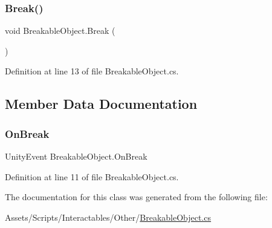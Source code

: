 \subsubsection{\texorpdfstring{Break()}{Break()}}
{\footnotesize\ttfamily void Breakable\+Object.\+Break (\begin{DoxyParamCaption}{ }\end{DoxyParamCaption})}



Definition at line 13 of file Breakable\+Object.\+cs.



\subsection{Member Data Documentation}
\mbox{\label{class_breakable_object_ab52a2c2d2d6438f97053da6c69d019e0}} 
\subsubsection{\texorpdfstring{On\+Break}{OnBreak}}
{\footnotesize\ttfamily Unity\+Event Breakable\+Object.\+On\+Break}



Definition at line 11 of file Breakable\+Object.\+cs.



The documentation for this class was generated from the following file\+:\begin{DoxyCompactItemize}
\item 
Assets/\+Scripts/\+Interactables/\+Other/\mbox{\hyperlink{_breakable_object_8cs}{Breakable\+Object.\+cs}}\end{DoxyCompactItemize}
